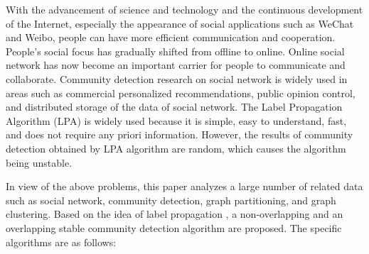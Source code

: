 \begin{englishabstract}

With the advancement of science and technology and the continuous development of the Internet, especially the appearance of social applications such as WeChat and Weibo, people can have more efficient communication and cooperation. People's social focus has gradually shifted from offline to online. Online social network has now become an important carrier for people to communicate and collaborate. Community detection research on social network is widely used in areas such as commercial personalized recommendations, public opinion control, and distributed storage of the data of social network. The Label Propagation Algorithm (LPA) is widely used because it is simple, easy to understand, fast, and does not require any priori information. However, the results of community detection obtained by LPA algorithm are random, which causes the algorithm being unstable.   

In view of the above problems, this paper analyzes a large number of related data such as social network, community detection, graph partitioning, and graph clustering. Based on the idea of label propagation , a non-overlapping and  an overlapping stable community detection algorithm are proposed. The specific algorithms are as follows:


\end{englishabstract}
